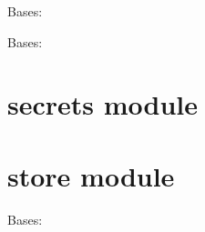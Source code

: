 \documentclass[letterpaper,10pt,english]{sphinxmanual}
\begin{document}

\begin{fulllineitems}
\label{geo:geo.MapResolution}
Bases: 

\end{fulllineitems}


\begin{fulllineitems}
\label{geo:geo.Point}
Bases: 

\end{fulllineitems}



\section{secrets module}
\label{secrets:module-secrets}\label{secrets::doc}\label{secrets:secrets-module}

\section{store module}
\label{store:store-module}\label{store:module-store}\label{store::doc}

\begin{fulllineitems}
\label{store:store.StoreType}
Bases: 

\end{fulllineitems}


\begin{fulllineitems}
\label{store:store.get_search_tweets}
\end{fulllineitems}


\begin{fulllineitems}
\label{store:store.read}
\end{fulllineitems}
\end{document}
